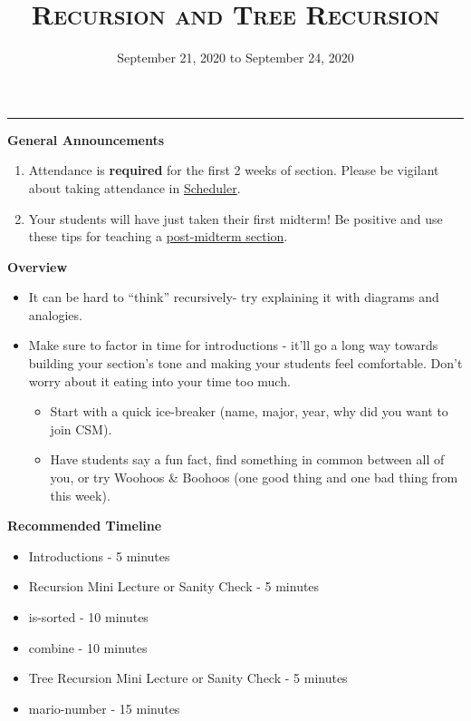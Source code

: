 \documentclass{exam}
\title{\textsc{Recursion and Tree Recursion}}
\date{September 21, 2020 to September 24, 2020}
\begin{document}
\maketitle
\rule{\textwidth}{0.15em}
\fontsize{12}{15}\selectfont

\begin{guide}
\textbf{General Announcements}
\begin{enumerate}
    \item Attendance is \textbf{required} for the first 2 weeks of section. Please be vigilant about taking attendance in \href{scheduler.csmentors.org}{Scheduler}.
    \item Your students will have just taken their first midterm! Be positive and use these tips for teaching a \href{https://docs.google.com/document/d/1Oj0Cmm_HKPOU3YsdBWu1VDF2O1nLYBO_VWaczuGMc8g/edit}{post-midterm section}.
\end{enumerate}
\end{guide}

\begin{guide}
\textbf{Overview}
\begin{itemize}
    \item It can be hard to ``think'' recursively- try explaining it with diagrams and analogies.
    \item Make sure to factor in time for introductions - it’ll go a long way towards building your section’s tone and making your students feel comfortable. Don’t worry about it eating into your time too much.
    \begin{itemize}
        \item Start with a quick ice-breaker (name, major, year, why did you want to join CSM).
        \item Have students say a fun fact, find something in common between all of you, or try Woohoos \& Boohoos (one good thing and one bad thing from this week).
    \end{itemize}
\end{itemize}
\end{guide}

\begin{guide}
\textbf{Recommended Timeline}
\begin{itemize}
    \item Introductions - 5 minutes
    \item Recursion Mini Lecture or Sanity Check - 5 minutes
    \item is-sorted - 10 minutes
    \item combine - 10 minutes
    \item Tree Recursion Mini Lecture or Sanity Check - 5 minutes
    \item mario-number - 15 minutes
\end{itemize}
\end{guide}
\end{document}
